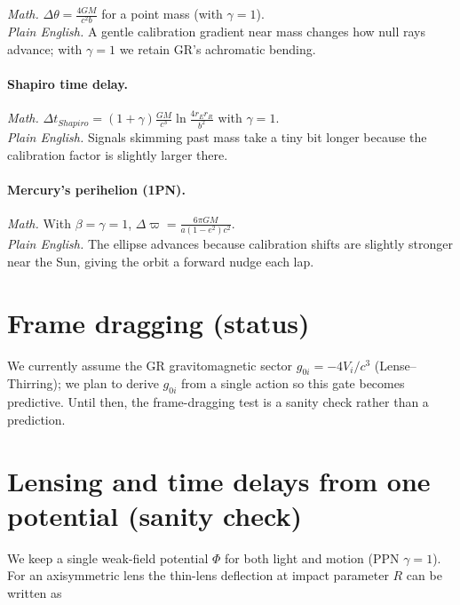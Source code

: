 \documentclass[
]{article}
\begin{document}
\emph{Math.} \(\Delta\theta = \frac{4GM}{c^{2}b}\) for a point mass
(with \(\gamma = 1\)).\\
\emph{Plain English.} A gentle calibration gradient near mass changes
how null rays advance; with \(\gamma = 1\) we retain GR's achromatic
bending.

\paragraph{Shapiro time delay.}\label{shapiro-time-delay.}

\emph{Math.}
\(\Delta t_{Shapiro} = (1 + \gamma)\frac{GM}{c^{3}}\ln\frac{4r_{E}r_{R}}{b^{2}}\)
with \(\gamma = 1\).\\
\emph{Plain English.} Signals skimming past mass take a tiny bit longer
because the calibration factor is slightly larger there.

\paragraph{Mercury's perihelion (1PN).}\label{mercurys-perihelion-1pn.}

\emph{Math.} With \(\beta = \gamma = 1\),
\(\Delta\varpi = \frac{6\pi GM}{a(1 - e^{2})c^{2}}\).\\
\emph{Plain English.} The ellipse advances because calibration shifts
are slightly stronger near the Sun, giving the orbit a forward nudge
each lap.

\section{Frame dragging (status)}\label{frame-dragging-status-1}

We currently assume the GR gravitomagnetic sector
\(g_{0i} = - 4V_{i}/c^{3}\) (Lense--Thirring); we plan to derive
\(g_{0i}\) from a single action so this gate becomes predictive. Until
then, the frame-dragging test is a sanity check rather than a
prediction.

\section{Lensing and time delays from one potential (sanity
check)}\label{lensing-and-time-delays-from-one-potential-sanity-check}

We keep a single weak-field potential \(\Phi\) for both light and motion
(PPN \(\gamma = 1\)). For an axisymmetric lens the thin-lens deflection
at impact parameter \(R\) can be written as
\end{document}

